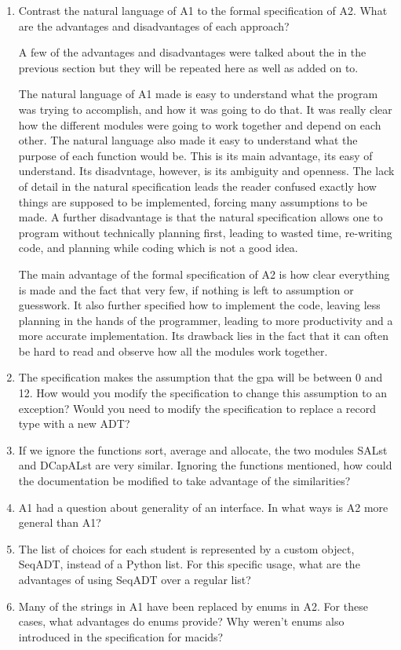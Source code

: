 \documentclass[12pt]{article}
\begin{document}
\begin{enumerate}

\item Contrast the natural language of A1 to the formal specification of A2.
What are the advantages and disadvantages of each approach?

A few of the advantages and disadvantages were talked about the in the previous
section but they will be repeated here as well as added on to.

The natural language of A1 made is easy to understand what the program was
trying to accomplish, and how it was going to do that. It was really clear
how the different modules were going to work together and depend on each
other. The natural language also made it easy to understand what the purpose
of each function would be. This is its main advantage, its easy of understand.
Its disadvntage, however, is its ambiguity and openness. The lack of detail
in the natural specification leads the reader confused exactly how things
are supposed to be implemented, forcing many assumptions to be made. A further
disadvantage is that the natural specification allows one to program without
technically planning first, leading to wasted time, re-writing code,
and planning while coding which is not a good idea.

The main advantage of the formal specification of A2 is how clear everything is
made and the fact that very few, if nothing is left to assumption or guesswork.
It also further specified how to implement the code, leaving less planning
in the hands of the programmer, leading to more productivity and a more accurate
implementation. Its drawback lies in the fact that it can often be hard to read
and observe how all the modules work together.

\item The specification makes the assumption that the gpa will be between 0 and 12.
How would you modify the specification to change this assumption to an exception?
Would you need to modify the specification to replace a record type with a new ADT?

\item If we ignore the functions sort, average and allocate, the two modules SALst and DCapALst
are very similar. Ignoring the functions mentioned, how could the documentation be modified 
to take advantage of the similarities?

\item A1 had a question about generality of an interface. In what ways is A2 more general
than A1?

\item The list of choices for each student is represented by a custom object, SeqADT, instead of a
Python list. For this specific usage, what are the advantages of using SeqADT over a regular list?

\item Many of the strings in A1 have been replaced by enums in A2. For these cases, what advantages do enums provide?
Why weren't enums also introduced in the specification for macids?

\end{enumerate}
\end{document}
